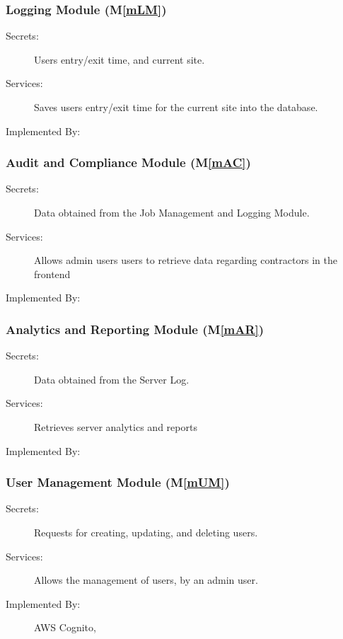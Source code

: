 \documentclass[12pt, titlepage]{article}
\newcommand{\mref}[1]{M\ref{#1}}
\begin{document}
\subsubsection{Logging Module (\mref{mLM})}
\begin{description}
  \item[Secrets:] Users entry/exit time, and current site.
  \item[Services:] Saves users entry/exit time for the current site
    into the database.
  \item[Implemented By:] \progname
\end{description}

\subsubsection{Audit and Compliance Module (\mref{mAC})}

\begin{description}
  \item[Secrets:] Data obtained from the Job Management and Logging Module.
  \item[Services:] Allows admin users users to retrieve data regarding
    contractors in the frontend
  \item[Implemented By:] \progname
\end{description}

\subsubsection{Analytics and Reporting Module (\mref{mAR})}
\begin{description}
  \item[Secrets:] Data obtained from the Server Log.
  \item[Services:] Retrieves server analytics and reports
  \item[Implemented By:] \progname
\end{description}

\subsubsection{User Management Module (\mref{mUM})}
\begin{description}
  \item[Secrets:] Requests for creating, updating, and deleting users.
  \item[Services:] Allows the management of users, by an admin user.
  \item[Implemented By:] AWS Cognito, \progname
\end{description}
\end{document}
